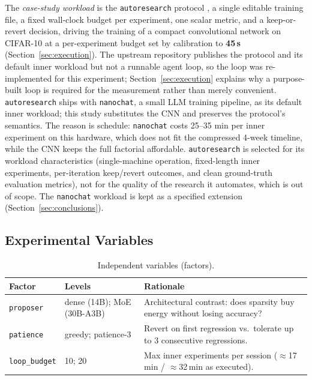 The \emph{case-study workload} is the \texttt{autoresearch} protocol \cite{karpathy2026autoresearch}, a single editable training file, a fixed wall-clock budget per experiment, one scalar metric, and a keep-or-revert decision, driving the training of a compact convolutional network on CIFAR-10 at a per-experiment budget set by calibration to \textbf{45\,s} (Section~\ref{sec:execution}). The upstream repository publishes the protocol and its default inner workload but not a runnable agent loop, so the loop was re-implemented for this experiment; Section~\ref{sec:execution} explains why a purpose-built loop is required for the measurement rather than merely convenient. \texttt{autoresearch} ships with \texttt{nanochat}, a small LLM training pipeline, as its default inner workload; this study substitutes the CNN and preserves the protocol's semantics. The reason is schedule: \texttt{nanochat} costs 25--35 min per inner experiment on this hardware, which does not fit the compressed 4-week timeline, while the CNN keeps the full factorial affordable. \texttt{autoresearch} is selected for its workload characteristics (single-machine operation, fixed-length inner experiments, per-iteration keep/revert outcomes, and clean ground-truth evaluation metrics), not for the quality of the research it automates, which is out of scope. The \texttt{nanochat} workload is kept as a specified extension (Section~\ref{sec:conclusions}).

\subsection{Experimental Variables}

\begin{table}[htbp]
\caption{Independent variables (factors).}
\label{tab:factors}
\small
\begin{tabular}{@{}p{1.7cm}p{1.9cm}p{2.8cm}@{}}
\toprule
\textbf{Factor} & \textbf{Levels} & \textbf{Rationale} \\
\midrule
\texttt{proposer} & dense (14B); MoE (30B-A3B) & Architectural contrast: does sparsity buy energy without losing accuracy? \\
\texttt{patience} & greedy; patience-3 & Revert on first regression vs.\ tolerate up to 3 consecutive regressions. \\
\texttt{loop\_budget} & 10; 20 & Max inner experiments per session ($\approx$17\,min / $\approx$32\,min as executed). \\
\bottomrule
\end{tabular}
\end{table}

